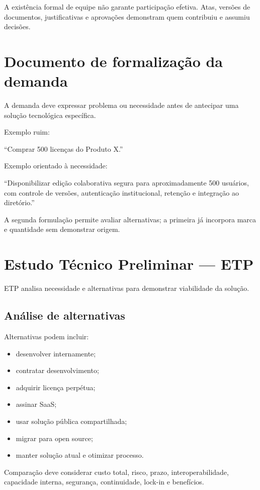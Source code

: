 A existência formal de equipe não garante participação efetiva. Atas, versões de documentos, justificativas e aprovações demonstram quem contribuiu e assumiu decisões.

\section{Documento de formalização da demanda}

A demanda deve expressar problema ou necessidade antes de antecipar uma solução tecnológica específica.

Exemplo ruim:

``Comprar 500 licenças do Produto X.''

Exemplo orientado à necessidade:

``Disponibilizar edição colaborativa segura para aproximadamente 500 usuários, com controle de versões, autenticação institucional, retenção e integração ao diretório.''

A segunda formulação permite avaliar alternativas; a primeira já incorpora marca e quantidade sem demonstrar origem.

\section{Estudo Técnico Preliminar — ETP}

ETP analisa necessidade e alternativas para demonstrar viabilidade da solução.

\subsection{Análise de alternativas}

Alternativas podem incluir:
\begin{itemize}
\item desenvolver internamente;
\item contratar desenvolvimento;
\item adquirir licença perpétua;
\item assinar SaaS;
\item usar solução pública compartilhada;
\item migrar para open source;
\item manter solução atual e otimizar processo.
\end{itemize}

Comparação deve considerar custo total, risco, prazo, interoperabilidade, capacidade interna, segurança, continuidade, lock-in e benefícios.

